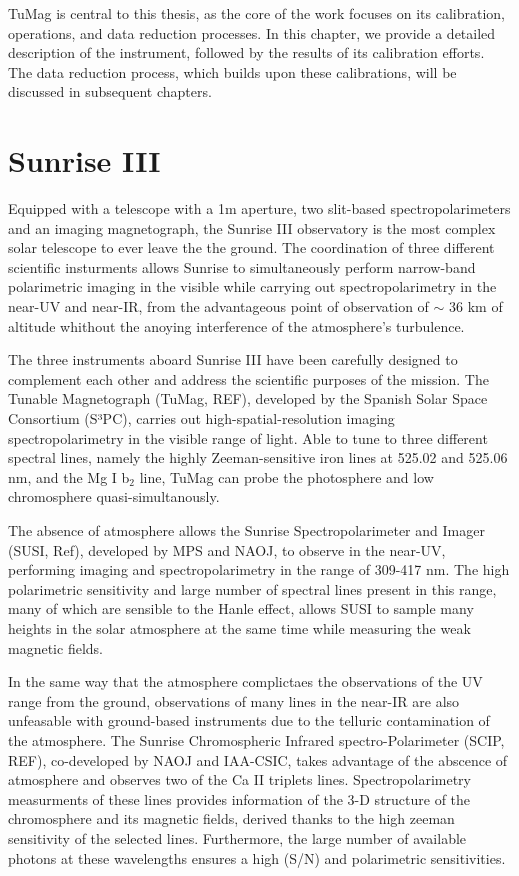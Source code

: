 TuMag is central to this thesis, as the core of the work focuses on its calibration, operations, and data reduction processes. In this chapter, we provide a detailed description of the instrument, followed by the results of its calibration efforts. The data reduction process, which builds upon these calibrations, will be discussed in subsequent chapters.

\section{Sunrise III}

Equipped with a telescope with a 1m aperture, two slit-based spectropolarimeters and an imaging magnetograph, the Sunrise III observatory is the most complex solar telescope to ever leave the the ground. The coordination of three different scientific insturments allows Sunrise to simultaneously perform narrow-band polarimetric imaging in the visible while carrying out spectropolarimetry in the near-UV and near-IR, from the advantageous point of observation of $\sim$ 36 km of altitude whithout the anoying interference of the atmosphere's turbulence. 

The three instruments aboard Sunrise III have been carefully designed to complement each other and address the scientific purposes of the mission. The Tunable Magnetograph (TuMag, REF), developed by the Spanish Solar Space Consortium (S³PC), carries out high-spatial-resolution imaging spectropolarimetry in the visible range of light. Able to tune to three different spectral lines, namely the highly Zeeman-sensitive iron lines at 525.02 and 525.06 nm, and the Mg I b$_2$ line, TuMag can probe the photosphere and low chromosphere quasi-simultanously. 

The absence of atmosphere allows the Sunrise Spectropolarimeter and Imager (SUSI, Ref), developed by MPS and NAOJ, to observe in the near-UV, performing imaging and spectropolarimetry in the range of 309-417 nm. The high polarimetric sensitivity and large number of spectral lines present in this range, many of which are sensible to the Hanle effect, allows SUSI to sample many heights in the solar atmosphere at the same time while measuring the weak magnetic fields. 

In the same way that the atmosphere complictaes the observations of the UV range from the ground, observations of many lines in the near-IR are also unfeasable with ground-based instruments due to the telluric contamination of the atmosphere. The Sunrise Chromospheric Infrared spectro-Polarimeter (SCIP, REF), co-developed by NAOJ and IAA-CSIC, takes advantage of the abscence of atmosphere and observes two of the Ca II triplets lines. Spectropolarimetry measurments of these lines provides information of the 3-D structure of the chromosphere and its magnetic fields, derived thanks to the high zeeman sensitivity of the selected lines. Furthermore, the large number of available photons at these wavelengths ensures a high (S/N) and polarimetric sensitivities. 

